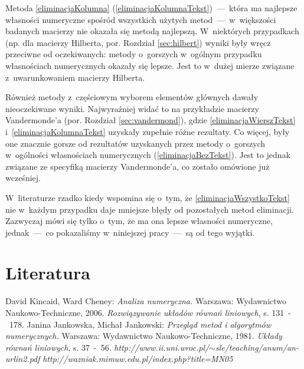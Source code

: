\documentclass[a4paper]{article}
\begin{document}
Metoda \ref{eliminacjaKolumna} (\ref{eliminacjaKolumnaTekst})~---~która ma najlepsze własności numeryczne spośród wszystkich użytych metod~---~w~większości badanych macierzy nie okazała się metodą najlepszą. W~niektórych przypadkach (np. dla macierzy Hilberta,
por. Rozdział \ref{sec:hilbert}) wyniki były wręcz przeciwne od oczekiwanych: metody o~gorszych w~ogólnym przypadku własnościach numerycznych okazały się lepsze. Jest to w~dużej mierze związane z~uwarunkowaniem macierzy Hilberta.

Również metody z~częściowym wyborem elementów głównych dawały nieoczekiwane wyniki. Najwyraźniej widać to na przykładzie macierzy Vandermonde'a (por. Rozdział \ref{sec:vandermond}), gdzie \ref{eliminacjaWierszTekst}
 i~\ref{eliminacjaKolumnaTekst}
uzyskały zupełnie różne rezultaty. Co więcej, były one znacznie gorsze od rezultatów uzyskanych przez metody o~gorszych w~ogólności własnościach numerycznych (\ref{eliminacjaBezTekst}). Jest to jednak związane ze specyfiką macierzy Vandermonde'a, co
zostało omówione już wcześniej.

W~literaturze rzadko kiedy wspomina się o~tym, że \ref{eliminacjaWszystkoTekst} nie w~każdym przypadku daje mniejsze błędy od pozostałych metod eliminacji. Zazwyczaj mówi się tylko o~tym, że ma ona lepsze własności numeryczne,
jednak~---~co pokazaliśmy w~niniejszej pracy~---~są od tego wyjątki.


\section{Literatura}
\renewcommand*{\refname}{}
\begin{thebibliography}{9}
    David Kincaid, Ward Cheney: \emph{Analiza numeryczna.} Warszawa: Wydawnictwo Naukowo-Techniczne, 2006. \emph{Rozwiązywanie układów równań liniowych}, s. 131~-~178.
    Janina Jankowska, Michał Jankowski: \emph{Przegląd metod i algorytmów numerycznych.} Warszawa: Wydawnictwo Naukowo-Techniczne, 1981. \emph{Układy równań liniowych}, s. 37~-~56.
    \emph{http://www.ii.uni.wroc.pl/$\sim$sle/teaching/anum/an-urlin2.pdf}
    \emph{http://wazniak.mimuw.edu.pl/index.php?title=MN05}
\end{thebibliography}
\end{document}
